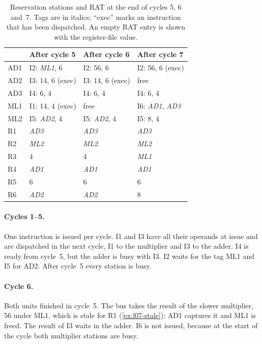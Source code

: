 \documentclass[../main.tex]{subfiles}
\begin{document}
\begin{table}[htbp]
  \centering\small
  \caption{Reservation stations and RAT at the end of cycles 5, 6 and~7.
    Tags are in italics; \enquote{exec} marks an instruction that has been
    dispatched.  An empty RAT entry is shown with the register-file value.}
  \label{tab:l07-state}
  \begin{tabular}{@{}llll@{}}
    \toprule
    & After cycle 5 & After cycle 6 & After cycle 7 \\
    \midrule
    AD1 & I2: \textit{ML1}, 6    & I2: 56, 6              & I2: 56, 6 (exec) \\
    AD2 & I3: 14, 6 (exec)       & I3: 14, 6 (exec)       & free \\
    AD3 & I4: 6, 4               & I4: 6, 4               & I4: 6, 4 \\
    ML1 & I1: 14, 4 (exec)       & free                   & I6: \textit{AD1}, \textit{AD3} \\
    ML2 & I5: \textit{AD2}, 4    & I5: \textit{AD2}, 4    & I5: 8, 4 \\
    \midrule
    R1  & \textit{AD3} & \textit{AD3} & \textit{AD3} \\
    R2  & \textit{ML2} & \textit{ML2} & \textit{ML2} \\
    R3  & 4            & 4            & \textit{ML1} \\
    R4  & \textit{AD1} & \textit{AD1} & \textit{AD1} \\
    R5  & 6            & 6            & 6 \\
    R6  & \textit{AD2} & \textit{AD2} & 8 \\
    \bottomrule
  \end{tabular}
\end{table}

\paragraph{Cycles 1--5.}  One instruction is issued per cycle.  I1 and I3
have all their operands at issue and are dispatched in the next cycle, I1 to
the multiplier and I3 to the adder.  I4 is ready from cycle~5, but the adder
is busy with I3.  I2 waits for the tag ML1 and I5 for AD2.  After cycle~5
every station is busy.

\paragraph{Cycle 6.}  Both units finished in cycle~5.  The bus takes the
result of the slower multiplier, 56 under ML1, which is stale for R1
(\cref{ex:l07-stale}); AD1 captures it and ML1 is freed.  The result of I3
waits in the adder.  I6 is not issued, because at the start of the cycle
both multiplier stations are busy.
\end{document}
